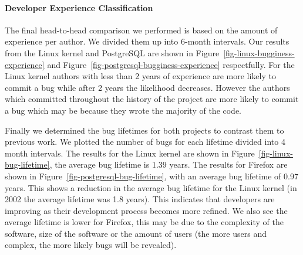 \paragraph{Developer Experience Classification}
The final head-to-head comparison we performed is based on the amount
of experience per author. We divided them up into 6-month intervals. 
Our results from the Linux kernel and PostgreSQL are shown in Figure~\ref{fig-linux-bugginess-experience} and Figure~\ref{fig-postgresql-bugginess-experience}
respectfully. For the Linux kernel authors with less than 2 years of experience
are more likely to commit a bug while after 2 years the likelihood
decreases. However the authors which committed throughout the history
of the project are more likely to commit a bug which may be because
they wrote the majority of the code. %



Finally we determined the bug lifetimes for both projects to contrast
them to previous work. We plotted the number of bugs for each lifetime
divided into 4 month intervals. The results for the Linux kernel are shown in
Figure~\ref{fig-linux-bug-lifetime}, the average bug lifetime is 1.39
years. The results for Firefox are shown in Figure~\ref{fig-postgresql-bug-lifetime}, with an average bug lifetime of 0.97
years. This shows a reduction in the average bug lifetime for the Linux kernel (in
2002 the average lifetime was 1.8 years). This indicates that
developers are improving as their development process becomes more
refined. We also see the average lifetime is lower for Firefox, this
may be due to the complexity of the software, size of the software or
the amount of users (the more users and complex, the more likely bugs will be
revealed).

